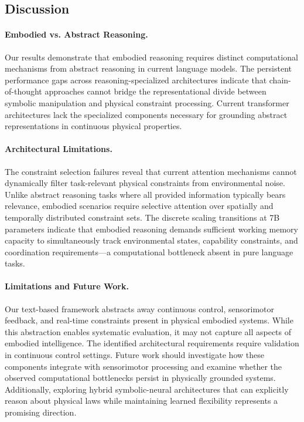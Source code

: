 \subsection{Discussion}
\label{sec:discussion}

\paragraph{Embodied vs. Abstract Reasoning.}
Our results demonstrate that embodied reasoning requires distinct computational mechanisms from abstract reasoning in current language models. The persistent performance gaps across reasoning-specialized architectures indicate that chain-of-thought approaches cannot bridge the representational divide between symbolic manipulation and physical constraint processing. Current transformer architectures lack the specialized components necessary for grounding abstract representations in continuous physical properties.

\paragraph{Architectural Limitations.}
The constraint selection failures reveal that current attention mechanisms cannot dynamically filter task-relevant physical constraints from environmental noise. Unlike abstract reasoning tasks where all provided information typically bears relevance, embodied scenarios require selective attention over spatially and temporally distributed constraint sets. The discrete scaling transitions at 7B parameters indicate that embodied reasoning demands sufficient working memory capacity to simultaneously track environmental states, capability constraints, and coordination requirements—a computational bottleneck absent in pure language tasks.

\paragraph{Limitations and Future Work.}
Our text-based framework abstracts away continuous control, sensorimotor feedback, and real-time constraints present in physical embodied systems. While this abstraction enables systematic evaluation, it may not capture all aspects of embodied intelligence. The identified architectural requirements require validation in continuous control settings. Future work should investigate how these components integrate with sensorimotor processing and examine whether the observed computational bottlenecks persist in physically grounded systems. Additionally, exploring hybrid symbolic-neural architectures that can explicitly reason about physical laws while maintaining learned flexibility represents a promising direction\citep{rabinowitz2018machine}.